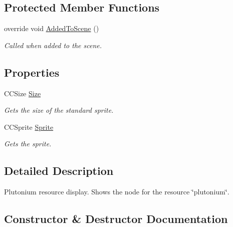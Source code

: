 \subsection*{Protected Member Functions}
\begin{DoxyCompactItemize}
\item 
override void \hyperlink{classClient_1_1Common_1_1Views_1_1HUD_1_1PlutoniumResource_af044359c748d76c7aceec25b2cdd6cf6}{Added\+To\+Scene} ()
\begin{DoxyCompactList}\small\item\em Called when added to the scene. \end{DoxyCompactList}\end{DoxyCompactItemize}
\subsection*{Properties}
\begin{DoxyCompactItemize}
\item 
C\+C\+Size \hyperlink{classClient_1_1Common_1_1Views_1_1HUD_1_1PlutoniumResource_a49c1a0b88a4ad603f43e665bc6144948}{Size}
\begin{DoxyCompactList}\small\item\em Gets the size of the standard sprite. \end{DoxyCompactList}\item 
C\+C\+Sprite \hyperlink{classClient_1_1Common_1_1Views_1_1HUD_1_1PlutoniumResource_addd487469c856c1778480729ade2ba73}{Sprite}
\begin{DoxyCompactList}\small\item\em Gets the sprite. \end{DoxyCompactList}\end{DoxyCompactItemize}


\subsection{Detailed Description}
Plutonium resource display. Shows the node for the resource \char`\"{}plutonium\char`\"{}. 



\subsection{Constructor \& Destructor Documentation}
\hypertarget{classClient_1_1Common_1_1Views_1_1HUD_1_1PlutoniumResource_afe78a9ecbfc0b97bbc0ae626c569175e}{}
